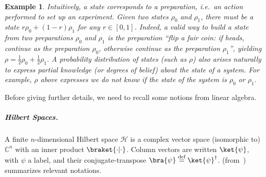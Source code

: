 \documentclass[10pt,a4paper]{article}
\newcommand*{\ie}{\emph{i.e.}\xspace}
\newcommand*{\defeq}{\stackrel{\text{def}}{=}}
\newcommand*{\C}{\mathbb{C}}
\newcommand{\HH}{\mathcal{H}}
\newtheorem{example}[theorem]{Example}
\begin{document}
\begin{example}
\label{ex:preparation}
Intuitively, a state corresponds to a \emph{preparation}, \ie\ an action performed to set up an experiment.
Given two states $\rho_0$ and $\rho_1$, there must be a state $r\rho_0 + (1-r)\rho_1$ for any $r\in[0,1]$.
Indeed, a valid way to build a state from two preparations $\rho_0$ and $\rho_1$ is the preparation ``flip a fair coin: if heads, continue as the preparation $\rho_0$, otherwise continue as the preparation $\rho_1$'', yielding $\rho = \tfrac12\rho_0 + \tfrac12\rho_1$.
A probability distribution of states (such as $\rho$) also arises naturally to express \emph{partial knowledge} (or \emph{degrees of belief}) about the state of a system.
For example, $\rho$ above expresses we do not know if the state of the system is $\rho_0$ or $\rho_1$.
\end{example}

Before giving further details, we need to recall some notions from linear algebra.

\subparagraph{Hilbert Spaces.}

A finite $n$-dimensional Hilbert space $\HH$ is a complex vector space (isomorphic to) $\C^n$ with an inner product $\braket{\cdot |\cdot}$.
Column vectors are written $\ket{\psi}$, with $\psi$ a label, and their conjugate-transpose $\bra{\psi} \defeq \ket{\psi}^\dagger$. 	
 (from~\cite{Nielsen_book}) summarizes relevant notations.
\end{document}
